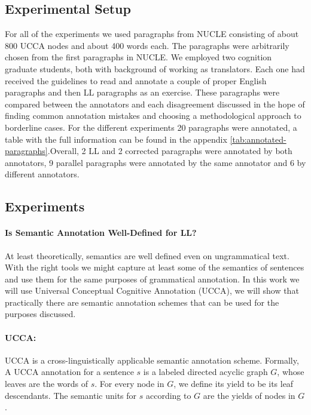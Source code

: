 \documentclass[letter,11pt]{article}
\begin{document}
\subsection{Experimental Setup}
 For all of the experiments we used paragraphs from NUCLE consisting of about 800 UCCA nodes and about 400 words each. The paragraphs were arbitrarily chosen from the first paragraphs in NUCLE.
 We employed two cognition graduate students, both
 with background of working as translators. Each
 one had received the guidelines to read and annotate a couple of
 proper English paragraphs and then LL paragraphs as
 an exercise. These paragraphs were compared between the annotators
 and each disagreement discussed in the hope of finding common annotation
 mistakes and choosing a methodological approach to borderline cases.
 For the different experiments 20 paragraphs were annotated, a table with the full information can be found in the appendix \ref{tab:annotated-paragraphs}.Overall, 2 LL and 2 corrected paragraphs were annotated by both annotators, 9 parallel paragraphs were annotated by the same annotator and 6 by different annotators.

\subsection{Experiments}

\paragraph{Is Semantic Annotation Well-Defined for LL?}

At least theoretically, semantics are well defined even on ungrammatical
text. With the right tools we might capture at least some of the semantics
of sentences and use them for the same purposes of grammatical annotation. In this work we will use Universal Conceptual Cognitive
Annotation (UCCA)\cite{abend2013universal}, we will show that practically
there are semantic annotation schemes that can be used for the purposes discussed.

\paragraph{UCCA:} UCCA  is a cross-linguistically applicable semantic annotation scheme. Formally, 
A UCCA annotation for a sentence $s$ is a labeled directed acyclic graph $G$, whose
leaves are the words of $s$. For every node in $G$,
we define its yield to be its leaf descendants. The
semantic units for $s$ according to $G$ are the yields
of nodes in $G$.
\end{document}
